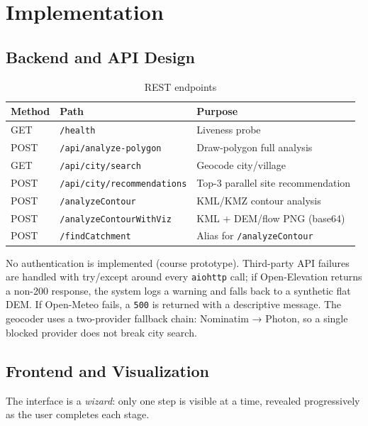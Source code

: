\documentclass[manuscript,screen,review]{acmart}
\begin{document}
\section{Implementation}
\label{sec:implementation}

\subsection{Backend and API Design}

\begin{table}[h]
  \caption{REST endpoints}
  \label{tab:endpoints}
  \begin{tabular}{p{1.8cm}p{2.8cm}p{2.4cm}}
    \toprule
    Method & Path & Purpose \\
    \midrule
    GET  & \texttt{/health}                    & Liveness probe \\
    POST & \texttt{/api/analyze-polygon}        & Draw-polygon full analysis \\
    GET  & \texttt{/api/city/search}            & Geocode city/village \\
    POST & \texttt{/api/city/recommendations}   & Top-3 parallel site recommendation \\
    POST & \texttt{/analyzeContour}             & KML/KMZ contour analysis \\
    POST & \texttt{/analyzeContourWithViz}      & KML + DEM/flow PNG (base64) \\
    POST & \texttt{/findCatchment}              & Alias for \texttt{/analyzeContour} \\
    \bottomrule
  \end{tabular}
\end{table}

No authentication is implemented (course prototype). Third-party API
failures are handled with try/except around every \texttt{aiohttp}
call; if Open-Elevation returns a non-200 response, the system logs a
warning and falls back to a synthetic flat DEM. If Open-Meteo fails,
a \texttt{500} is returned with a descriptive message. The geocoder
uses a two-provider fallback chain: Nominatim → Photon, so a single
blocked provider does not break city search.

\subsection{Frontend and Visualization}

The interface is a \emph{wizard}: only one step is visible at a time,
revealed progressively as the user completes each stage.
\end{document}
